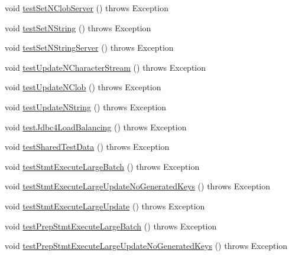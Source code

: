 \begin{DoxyCompactItemize}
void \mbox{\hyperlink{classtestsuite_1_1simple_1_1_statements_test_a92f5e47200bc8ffaad2c183619802e81}{test\+Set\+N\+Clob\+Server}} ()  throws Exception 
\item 
void \mbox{\hyperlink{classtestsuite_1_1simple_1_1_statements_test_ad9dac6567ad8cfd19cc81d908c2d143b}{test\+Set\+N\+String}} ()  throws Exception 
\item 
void \mbox{\hyperlink{classtestsuite_1_1simple_1_1_statements_test_abec2b7d40eb32e7b87af7c38836b9917}{test\+Set\+N\+String\+Server}} ()  throws Exception 
\item 
void \mbox{\hyperlink{classtestsuite_1_1simple_1_1_statements_test_a3d0a79f353f51403a5d7d3f0af149ad3}{test\+Update\+N\+Character\+Stream}} ()  throws Exception 
\item 
void \mbox{\hyperlink{classtestsuite_1_1simple_1_1_statements_test_a659cc0e7a3ffc297310c1397fd769983}{test\+Update\+N\+Clob}} ()  throws Exception 
\item 
void \mbox{\hyperlink{classtestsuite_1_1simple_1_1_statements_test_a4e41b5f592b49aa789051d554d859a7b}{test\+Update\+N\+String}} ()  throws Exception 
\item 
void \mbox{\hyperlink{classtestsuite_1_1simple_1_1_statements_test_a42f2c236227da75b34af8254c907ce4f}{test\+Jdbc4\+Load\+Balancing}} ()  throws Exception 
\item 
void \mbox{\hyperlink{classtestsuite_1_1simple_1_1_statements_test_affafb967129c6b038a22a6fd14f36517}{test\+Shared\+Test\+Data}} ()  throws Exception 
\item 
void \mbox{\hyperlink{classtestsuite_1_1simple_1_1_statements_test_af89deb67acea573deb64576a0e66209f}{test\+Stmt\+Execute\+Large\+Batch}} ()  throws Exception 
\item 
void \mbox{\hyperlink{classtestsuite_1_1simple_1_1_statements_test_a749b7dc6b7d4433d4a9987c89cdfc059}{test\+Stmt\+Execute\+Large\+Update\+No\+Generated\+Keys}} ()  throws Exception 
\item 
void \mbox{\hyperlink{classtestsuite_1_1simple_1_1_statements_test_aa561c4a6b26c64026a884c9c9dd244a7}{test\+Stmt\+Execute\+Large\+Update}} ()  throws Exception 
\item 
void \mbox{\hyperlink{classtestsuite_1_1simple_1_1_statements_test_abb3b5923dd7282394306f43b0d98736d}{test\+Prep\+Stmt\+Execute\+Large\+Batch}} ()  throws Exception 
\item 
void \mbox{\hyperlink{classtestsuite_1_1simple_1_1_statements_test_aa679a99f5f5ae5968edee30a5c6f9c35}{test\+Prep\+Stmt\+Execute\+Large\+Update\+No\+Generated\+Keys}} ()  throws Exception 

\end{DoxyCompactItemize}
